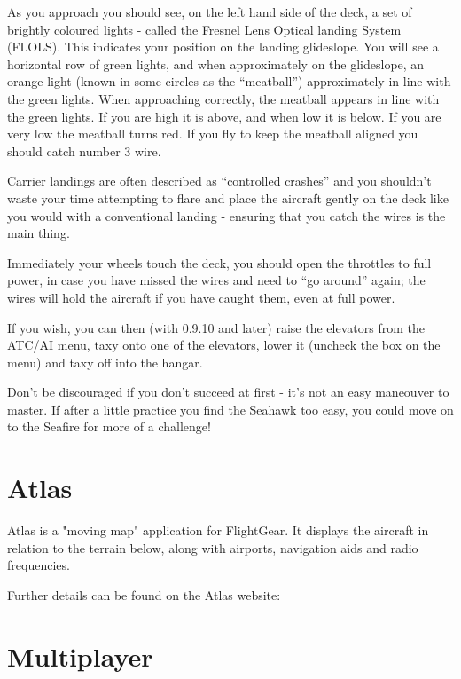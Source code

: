As you approach you should see, on the left hand side of the deck, a set of brightly coloured lights - called 
the Fresnel Lens Optical landing System (FLOLS). This indicates your position on the landing glideslope. 
You will see a horizontal row of green lights, and when approximately on the glideslope, an orange light 
(known in some circles as the ``meatball'') approximately in line with the green lights. When approaching 
correctly, the meatball appears in line with the green lights. If you are high it is above, and when low 
it is below. If you are very low the meatball turns red. If you fly to keep the meatball aligned you 
should catch number 3 wire.

Carrier landings are often described as ``controlled crashes'' and you shouldn't waste your time attempting 
to flare and place the aircraft gently on the deck like you would with a conventional landing - ensuring that 
you catch the wires is the main thing.

Immediately your wheels touch the deck, you should open the throttles to full power, in case you have 
missed the wires and need to ``go around'' again; the wires will hold the aircraft if you have caught them, 
even at full power.

If you wish, you can then (with 0.9.10 and later) raise the elevators from the ATC/AI menu, taxy onto one of the elevators, 
lower it (uncheck the box on the menu) and taxy off into the hangar.

Don't be discouraged if you don't succeed at first - it's not an easy maneouver to master. If after a little 
practice you find the Seahawk too easy, you could move on to the Seafire for more of a challenge! 


\section{Atlas\label{Atlas}}

Atlas is a "moving map" application for FlightGear. It displays the aircraft in relation to the terrain below, 
along with airports, navigation aids and radio frequencies. 

Further details can be found on the Atlas website:

\noindent
{}

\section{Multiplayer}

